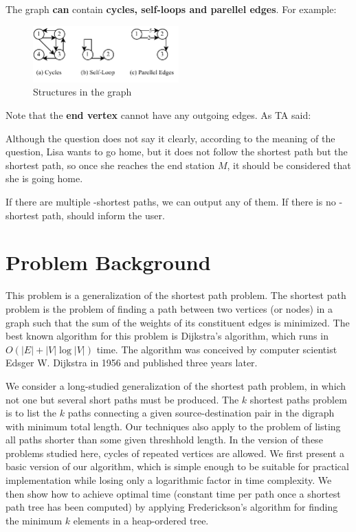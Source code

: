 \documentclass[a4paper,oneside]{book}
\begin{document}
The graph \textbf{can} contain \textbf{cycles, self-loops and parellel edges}. For example:

\begin{figure}[!ht]
    \centering
    \caption{Structures in the graph}
    \includegraphics[width=0.5\textwidth]{src/graph_type.drawio.pdf}
\end{figure}

Note that the \textbf{end vertex} cannot have any outgoing edges. As TA said:

\begin{displayquote}
Although the question does not say it clearly, according to the meaning of the question, Lisa wants to go home, but it does not follow the shortest path but the shortest path, so once she reaches the end station $M$, it should be considered that she is going home.
\end{displayquote}

If there are multiple -shortest paths, we can output any of them. If there is no -shortest path, should inform the user.

\section{Problem Background}

This problem is a generalization of the shortest path problem. The shortest path problem is the problem of finding a path between two vertices (or nodes) in a graph such that the sum of the weights of its constituent edges is minimized. The best known algorithm for this problem is Dijkstra's algorithm, which runs in $O(|E| + |V| \log |V|)$ time. The algorithm was conceived by computer scientist Edsger W. Dijkstra in 1956 and published three years later.

We consider a long-studied generalization of the shortest path problem, in which not one but several short paths must be produced. The $k$ shortest paths problem is to list the $k$ paths connecting a given source-destination pair in the digraph with minimum total length. Our techniques also apply to the problem of listing all paths shorter than some given threshhold length. In the version of these problems studied here, cycles of repeated vertices are allowed. We first present a basic version of our algorithm, which is simple enough to be suitable for practical implementation while losing only a logarithmic factor in time complexity. We then show how to achieve optimal time (constant time per path once a shortest path tree has been computed) by applying Frederickson's algorithm for finding the minimum $k$ elements in a heap-ordered tree.
\end{document}
